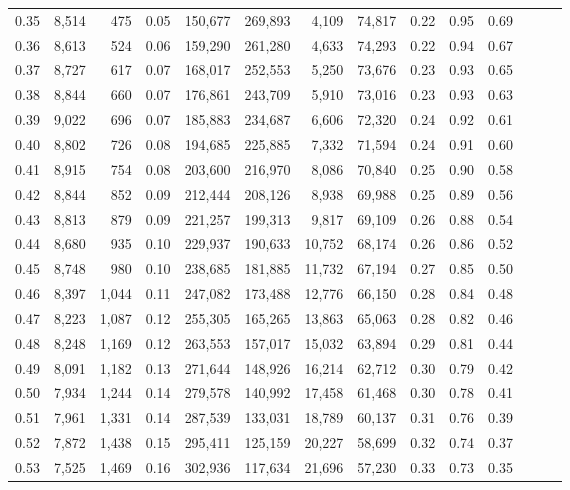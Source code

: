 \begin{tabular}{rrrrrrrrrrrrrr}
0.35 &  8,514 &    475 &  0.05 &  150,677 &  269,893 &   4,109 &  74,817 &  0.22 &  0.95 &      0.69 \\
0.36 &  8,613 &    524 &  0.06 &  159,290 &  261,280 &   4,633 &  74,293 &  0.22 &  0.94 &      0.67 \\
0.37 &  8,727 &    617 &  0.07 &  168,017 &  252,553 &   5,250 &  73,676 &  0.23 &  0.93 &      0.65 \\
0.38 &  8,844 &    660 &  0.07 &  176,861 &  243,709 &   5,910 &  73,016 &  0.23 &  0.93 &      0.63 \\
0.39 &  9,022 &    696 &  0.07 &  185,883 &  234,687 &   6,606 &  72,320 &  0.24 &  0.92 &      0.61 \\
0.40 &  8,802 &    726 &  0.08 &  194,685 &  225,885 &   7,332 &  71,594 &  0.24 &  0.91 &      0.60 \\
0.41 &  8,915 &    754 &  0.08 &  203,600 &  216,970 &   8,086 &  70,840 &  0.25 &  0.90 &      0.58 \\
0.42 &  8,844 &    852 &  0.09 &  212,444 &  208,126 &   8,938 &  69,988 &  0.25 &  0.89 &      0.56 \\
0.43 &  8,813 &    879 &  0.09 &  221,257 &  199,313 &   9,817 &  69,109 &  0.26 &  0.88 &      0.54 \\
0.44 &  8,680 &    935 &  0.10 &  229,937 &  190,633 &  10,752 &  68,174 &  0.26 &  0.86 &      0.52 \\
0.45 &  8,748 &    980 &  0.10 &  238,685 &  181,885 &  11,732 &  67,194 &  0.27 &  0.85 &      0.50 \\
0.46 &  8,397 &  1,044 &  0.11 &  247,082 &  173,488 &  12,776 &  66,150 &  0.28 &  0.84 &      0.48 \\
0.47 &  8,223 &  1,087 &  0.12 &  255,305 &  165,265 &  13,863 &  65,063 &  0.28 &  0.82 &      0.46 \\
0.48 &  8,248 &  1,169 &  0.12 &  263,553 &  157,017 &  15,032 &  63,894 &  0.29 &  0.81 &      0.44 \\
0.49 &  8,091 &  1,182 &  0.13 &  271,644 &  148,926 &  16,214 &  62,712 &  0.30 &  0.79 &      0.42 \\
0.50 &  7,934 &  1,244 &  0.14 &  279,578 &  140,992 &  17,458 &  61,468 &  0.30 &  0.78 &      0.41 \\
0.51 &  7,961 &  1,331 &  0.14 &  287,539 &  133,031 &  18,789 &  60,137 &  0.31 &  0.76 &      0.39 \\
0.52 &  7,872 &  1,438 &  0.15 &  295,411 &  125,159 &  20,227 &  58,699 &  0.32 &  0.74 &      0.37 \\
0.53 &  7,525 &  1,469 &  0.16 &  302,936 &  117,634 &  21,696 &  57,230 &  0.33 &  0.73 &      0.35 \\

\end{tabular}
